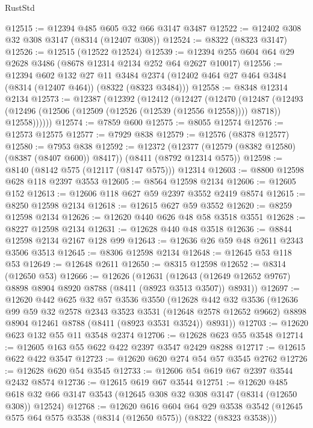 \begin{lexlean}{RustStd}
\begin{coremodule}
@12515 := @12394 @485 @605 @32 @66 @3147 @3487
@12522 := @12402 @308 @32 @308 @3147 (@8314 (@12407 @308))
@12524 := @8322 (@8323 @3147)
@12526 := @12515 (@12522 @12524)
@12539 := @12394 @255 @604 @64 @29 @2628 @3486 (@8678 @12314 @2134 @252 @64 @2627 @10017)
@12556 := @12394
    @602
    @132
    @27
    @11
    @3484
    @2374
    (@12402 @464 @27 @464 @3484 (@8314 (@12407 @464)) (@8322 (@8323 @3484)))
@12558 := @8348 @12314 @2134
@12573 := @12387
    (@12392
      (@12412
        (@12427
          (@12470
            (@12487
              (@12493
                (@12496 (@12506 (@12509 (@12526 (@12539 (@12556 @12558)))) @8718))
                @12558))))))
@12574 := @7859 @600
@12575 := @8055 @12574
@12576 := @12573 @12575
@12577 := @7929 @838
@12579 := @12576 (@8378 @12577)
@12580 := @7953 @838
@12592 := @12372
    (@12377 (@12579 (@8382 @12580) (@8387 (@8407 @600)) @8417))
    (@8411 (@8792 @12314 @575))
@12598 := @8140 (@8142 @575 (@12117 (@8147 @575))) @12314
@12603 := @8800 @12598 @628 @118 @2397 @3553
@12605 := @8564 @12598 @2134
@12606 := @12605 @152
@12613 := @12606 @118 @627 @59 @2397 @3552 @2419 @8574
@12615 := @8250 @12598 @2134
@12618 := @12615 @627 @59 @3552
@12620 := @8259 @12598 @2134
@12626 := @12620 @440 @626 @48 @58 @3518 @3551
@12628 := @8227 @12598 @2134
@12631 := @12628 @440 @48 @3518
@12636 := @8844 @12598 @2134 @2167 @128 @99
@12643 := @12636 @26 @59 @48 @2611 @2343 @3506 @3513
@12645 := @8306 @12598 @2134
@12648 := @12645 @53 @118 @53
@12649 := @12648 @2611
@12650 := @8315 @12598
@12652 := @8314 (@12650 @53)
@12666 := @12626
    (@12631
      (@12643 (@12649 @12652 @9767) @8898 @8904 @8920 @8788 (@8411 (@8923 @3513 @3507)) @8931))
@12697 := @12620
    @442
    @625
    @32
    @57
    @3536
    @3550
    (@12628
      @442
      @32
      @3536
      (@12636
        @99
        @59
        @32
        @2578
        @2343
        @3523
        @3531
        (@12648 @2578 @12652 @9662)
        @8898
        @8904
        @12461
        @8788
        (@8411 (@8923 @3531 @3524))
        @8931))
@12703 := @12620 @623 @132 @55 @11 @3548 @2374
@12706 := @12628 @623 @55 @3548
@12714 := @12605 @163 @55 @622 @422 @2397 @3547 @2429 @8288
@12717 := @12615 @622 @422 @3547
@12723 := @12620 @620 @274 @54 @57 @3545 @2762
@12726 := @12628 @620 @54 @3545
@12733 := @12606 @54 @619 @67 @2397 @3544 @2432 @8574
@12736 := @12615 @619 @67 @3544
@12751 := @12620
    @485
    @618
    @32
    @66
    @3147
    @3543
    (@12645 @308 @32 @308 @3147 (@8314 (@12650 @308)) @12524)
@12768 := @12620
    @616
    @604
    @64
    @29
    @3538
    @3542
    (@12645 @575 @64 @575 @3538 (@8314 (@12650 @575)) (@8322 (@8323 @3538)))

\end{coremodule}
\end{lexlean}
